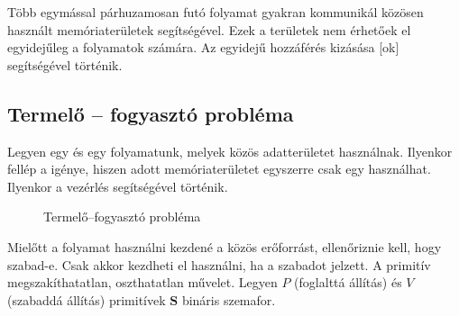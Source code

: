 \documentclass[../main.tex]{subfiles}
\begin{document}
Több egymással párhuzamosan futó folyamat gyakran kommunikál közösen használt
memóriaterületek segítségével. Ezek a területek nem érhetőek el egyidejűleg a
folyamatok számára. Az egyidejű hozzáférés kizásása [ok]
segítségével történik.

\subsection{Termelő -- fogyasztó probléma}

Legyen egy  és egy  folyamatunk, melyek közös
adatterületet használnak. Ilyenkor fellép a  igénye,
hiszen adott memóriaterületet egyszerre csak egy  használhat.
Ilyenkor a vezérlés  segítségével történik.

\begin{figure}[H]
	\centering
	\caption{Termelő--fogyasztó probléma}
	\label{fig:semafor}
\end{figure}

Mielőtt a folyamat használni kezdené a közös erőforrást, ellenőriznie kell,
hogy szabad-e. Csak akkor kezdheti el használni, ha a  szabadot
jelzett. A primitív megszakíthatatlan, oszthatatlan művelet.
Legyen $P$ (foglalttá állítás) és $V$ (szabaddá állítás) primitívek
$\mathbf{S}$ bináris szemafor.
\end{document}
